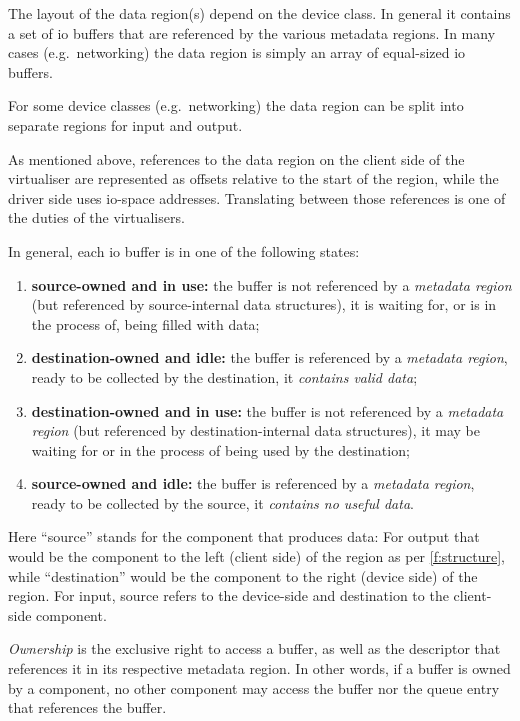 \documentclass[a4paper,12pt]{report}
\newcommand{\Obj}[1]{\textsl{#1}}
\begin{document}
The layout of the data region(s) depend on the device class. In general
it contains a set of \gls{io} buffers that are referenced by the various
metadata regions. In many cases (e.g.\
networking) the data region is simply an array of equal-sized \gls{io}
buffers.

For some device classes (e.g.\ networking) the data region can be split
into separate regions for input and output.

As mentioned above, references to the data region on the client side
of the virtualiser are represented as offsets relative to the start of
the region, while the driver side uses
\gls{io}-space addresses. Translating between those references is one of
the duties of the virtualisers.

In general, each \gls{io} buffer is in one of the following states:
\begin{enumerate}
\item\label{st:so_u}\textbf{source-owned and in use:} the buffer is not referenced by a
 \Obj{metadata region} (but referenced by source-internal data structures),
  it is waiting for, or is in the process of, being filled with data;
\item\label{st:do_i} \textbf{destination-owned and idle:} the buffer
  is referenced by a \Obj{metadata
  region}, ready to be collected by the destination, it \emph{contains valid data};
\item\label{st:do_u} \textbf{destination-owned and in use:} the buffer is not referenced by a
  \Obj{metadata region} (but referenced by destination-internal data
  structures), it may be waiting for or in the process of being
  used by the destination;
\item\label{st:so_i} \textbf{source-owned and idle:} the buffer is referenced by a \Obj{metadata
  region}, ready to be collected by the source, it \emph{contains no useful data}.
\end{enumerate}
Here ``source'' stands for the component that produces data: For output
that would be the component to the left (client side) of the region as
per \autoref{f:structure}, while ``destination'' would be the
component to the right (device side) of the region.
For input, source refers to the device-side and destination to the
client-side component.

\emph{Ownership} is the exclusive right to access a buffer, as well as
the descriptor that references it in its respective metadata region. In other
words, if a buffer is owned by a component, no other component may
access the buffer nor the queue entry that references the buffer.
\end{document}
